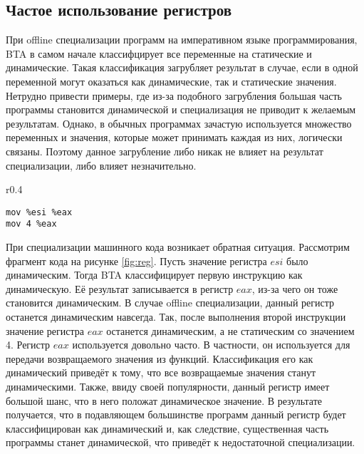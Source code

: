 \documentclass{spbau-diploma}
\begin{document}
\subsection{Частое использование регистров}
\label{part:4.1}
При offline специализации программ на императивном языке программирования, BTA в самом начале классифцирует все переменные на статические и динамические. Такая классификация загрубляет результат в случае, если в одной переменной могут оказаться как динамические, так и статические значения. Нетрудно привести примеры, где из-за подобного загрубления большая часть программы становится динамической и специализация не приводит к желаемым результатам. Однако, в обычных программах зачастую используется множество переменных и значения, которые может принимать каждая из них, логически связаны. Поэтому данное загрубление либо никак не влияет на результат специализации, либо влияет незначительно.

\begin{wrapfigure}{r}{0.4\textwidth}
\begin{lstlisting}[xleftmargin = 20pt]
mov %esi %eax
mov 4 %eax
\end{lstlisting}
\caption{Фрагмент кода}
\label{fig:reg}
\end{wrapfigure}
При специализации машинного кода возникает обратная ситуация. Рассмотрим фрагмент кода на рисунке \ref{fig:reg}. Пусть значение регистра $esi$ было динамическим. Тогда BTA классифицирует первую инструкцию как динамическую. Её результат записывается в регистр $eax$, из-за чего он тоже становится динамическим. В случае offline специализации, данный регистр останется динамическим навсегда. Так, после выполнения второй инструкции значение регистра $eax$ останется динамическим, а не статическим со значением 4. Регистр $eax$ используется довольно часто. В частности, он используется для передачи возвращаемого значения из функций. Классификация его как динамический приведёт к тому, что все возвращаемые значения станут динамическими. Также, ввиду своей популярности, данный регистр имеет большой шанс, что в него положат динамическое значение. В результате получается, что в подавляющем большинстве программ данный регистр будет классифицирован как динамический и, как следствие, существенная часть программы станет динамической, что приведёт к недостаточной специализации.
\end{document}
